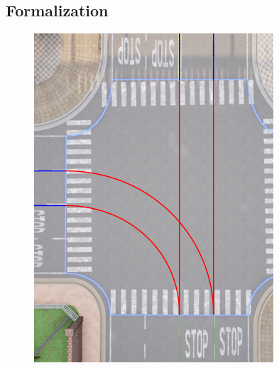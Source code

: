 \subsection{Formalization}

\begin{figure}%
  \centering
  \begin{minipage}[t]{.363\linewidth}
    {\includegraphics[width=\linewidth]{figures/chapter4/lanes-south.png}}%
  \end{minipage}%
  \hfill
  \begin{minipage}[t]{.3\linewidth}

\end{minipage}
\end{figure}
